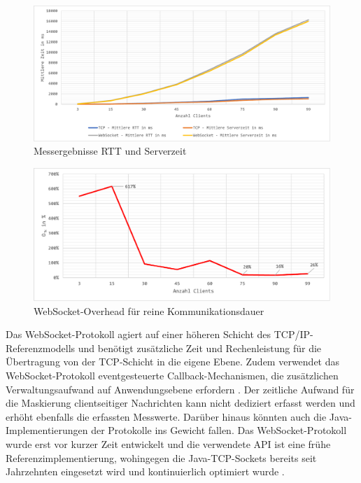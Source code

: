 \documentclass[11pt,a4paper,titlepage]{scrartcl}
\numberwithin{equation}{section}
\begin{document}
\begin{figure}[ht] 
	\begin{center}
		\includegraphics[scale=0.5]{img/benchmark-rttst.pdf}
		\caption{Messergebnisse RTT und Serverzeit}
		\label{fig:evalRttSt}
	\end{center}
\end{figure}
\begin{figure}[ht] 
	\begin{center}
		\includegraphics[scale=0.7]{img/benchmark-tk.pdf}
		\caption{WebSocket-Overhead für reine Kommunikationsdauer}
		\label{fig:evalTk}
	\end{center}
\end{figure} 
\noindent Das WebSocket-Protokoll agiert auf einer höheren Schicht des TCP/IP-Referenzmodells und benötigt zusätzliche Zeit und Rechenleistung für die Übertragung von der TCP-Schicht in die eigene Ebene. Zudem verwendet das WebSocket-Protokoll eventgesteuerte Callback-Mechanismen, die zusätzlichen Verwaltungsaufwand auf Anwendungsebene erfordern \autocite[1007]{skvorc_performance_2014}. Der zeitliche Aufwand für die Maskierung clientseitiger Nachrichten kann nicht dediziert erfasst werden und erhöht ebenfalls die erfassten Messwerte. Darüber hinaus könnten auch die Java-Implementierungen der Protokolle ins Gewicht fallen. Das WebSocket-Protokoll wurde erst vor kurzer Zeit entwickelt und die verwendete API ist eine frühe Referenzimplementierung, wohingegen die Java-TCP-Sockets bereits seit Jahrzehnten eingesetzt wird und kontinuierlich optimiert wurde \autocite[1007]{skvorc_performance_2014}. \\
\end{document}
